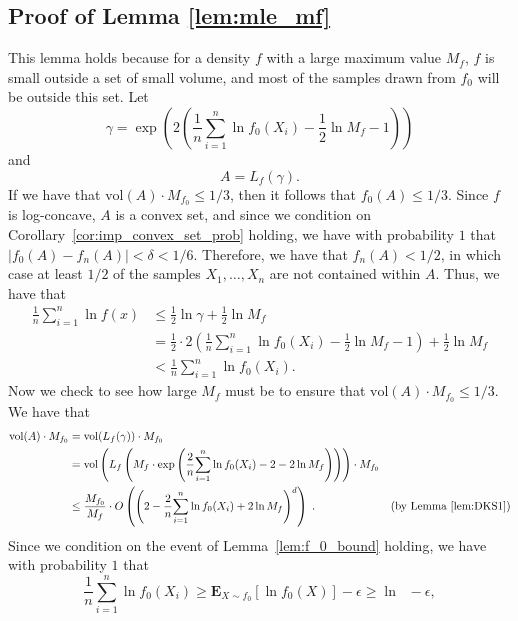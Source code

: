 \documentclass[final,12pt]{colt2018}
\newcommand{\nnew}[1]{{\color{red} #1}}
\newcommand{\nnew}[1]{#1}
\newtheorem{informal theorem}[theorem]{Theorem (informal statement)}
\newcommand{\E}{\mathbf{E}}
\newcommand{\eps}{\epsilon}
\newcommand{\pmin}{\mathop{p_{\mathrm{min}}}}
\newcommand{\vol}{\mathrm{vol}}
\begin{document}
\subsection{ {Proof of Lemma \ref{lem:mle_mf}}}
\nnew{This lemma holds because for a density $f$ with a large maximum value $M_f$, $f$ is small outside a set of small volume, and most of the samples drawn from $f_0$ will be outside this set.}
Let
\[
\gamma = \exp{\left( 2 \left( \frac{1}{n}  {\sum_{i=1}^{n} \ln f_0(X_i)} - \frac{1}{2}\ln M_f - 1 \right) \right)}
\]
and
\[
A = L_f(\gamma).
\]
If we have that $\vol(A) \cdot M_{f_0} \leq 1/3$, then it follows that $f_0(A) \leq 1/3$. Since $f$ is log-concave, $A$ is a convex set, and since we condition on Corollary~\ref{cor:imp_convex_set_prob} holding, we have with probability $1$ that $|f_0(A) - f_n(A)| < \delta < 1/6$. Therefore, we have that $f_n(A) < 1/2$, in which case at least $1/2$ of the samples  {$X_1, \ldots, X_n$} are not contained within $A$. Thus, we have that
\begin{align*}
\frac{1}{n}  {\sum_{i=1}^{n}} \ln f(x) &\leq \frac{1}{2}\ln \gamma + \frac{1}{2}\ln M_f \\
&= \frac{1}{2} \cdot 2 \left( \frac{1}{n}  {\sum_{i=1}^{n} \ln f_0(X_i)} - \frac{1}{2}\ln M_f - 1 \right) + \frac{1}{2}\ln M_f \\
&< \frac{1}{n}  {\sum_{i=1}^{n} \ln f_0(X_i)}.
\end{align*}
Now we check to see how large $M_f$ must be to ensure that $\vol(A) \cdot M_{f_0} \leq 1/3$.
We have that
\begin{align*}
\vol(A) \cdot M_{f_0} &= \vol(L_f(\gamma)) \cdot M_{f_0} \\
&= \vol\left(L_f\left( M_f \cdot \exp{\left( \frac{2}{n}  {\sum_{i=1}^{n}  \ln f_0(X_i)} - 2  -2 \ln M_f \right) } \right)\right) \cdot M_{f_0} \\
&\leq \frac{M_{f_0}}{M_f} \cdot O\left( \left(2 - \frac{2}{n}  {\sum_{i=1}^{n}  \ln f_0(X_i)}  +2 \ln M_f \right)^d \right)\;. &\text{(by Lemma \ref{lem:DKS1})}
\end{align*}
Since we condition on the event of Lemma~\ref{lem:f_0_bound} holding, we have with probability $1$ that
\[
\frac{1}{n}  {\sum_{i=1}^{n}  \ln f_0(X_i)} \geq {\E}_{X \sim f_0} \left[\ln f_0(X)\right] - \eps \geq \ln \pmin - \eps,
\]
\end{document}
